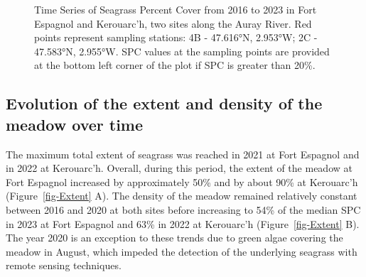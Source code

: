 \documentclass[
  number]{elsarticle}
\begin{document}
\label{cell-fig-Maps}
\begin{figure}[H]


\caption{\label{fig-Maps}Time Series of Seagrass Percent Cover from 2016
to 2023 in Fort Espagnol and Kerouarc'h, two sites along the Auray
River. Red points represent sampling stations: 4B - 47.616°N, 2.953°W;
2C - 47.583°N, 2.955°W. SPC values at the sampling points are provided
at the bottom left corner of the plot if SPC is greater than 20\%.}

\end{figure}%

\subsection{Evolution of the extent and density of the meadow over
time}\label{evolution-of-the-extent-and-density-of-the-meadow-over-time}

The maximum total extent of seagrass was reached in 2021 at Fort
Espagnol and in 2022 at Kerouarc'h. Overall, during this period, the
extent of the meadow at Fort Espagnol increased by approximately 50\%
and by about 90\% at Kerouarc'h (Figure~\ref{fig-Extent} A). The density
of the meadow remained relatively constant between 2016 and 2020 at both
sites before increasing to 54\% of the median SPC in 2023 at Fort
Espagnol and 63\% in 2022 at Kerouarc'h (Figure~\ref{fig-Extent} B). The
year 2020 is an exception to these trends due to green algae covering
the meadow in August, which impeded the detection of the underlying
seagrass with remote sensing techniques.
\end{document}
